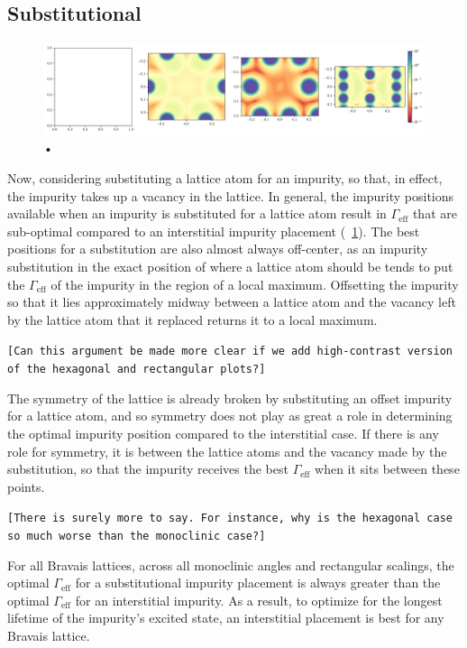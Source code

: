 \documentclass[aps,pra,superscriptaddress,twocolumn]{revtex4-1}
\newcommand{\fref}[1]{\text{Fig.}~\ref{#1}}
\newcommand{\commentSB}[1]{\texttt{\color{blue}[#1]}}
\begin{document}
\subsection{Substitutional}

\begin{figure}
    \centering
    \includegraphics[width=1.0\textwidth]{figures/temp_substitution_figure.png} 
    \caption{•}
    \label{fig:substitution}
\end{figure}

Now, considering substituting a lattice atom for an impurity, so that, in effect, the impurity takes up a vacancy in the lattice.
In general, the impurity positions available when an impurity is substituted for a lattice atom result in $\Gamma_\text{eff}$ that are sub-optimal compared to an interstitial impurity placement (\fref{fig:substitution}). The best positions for a substitution are also almost always off-center, as an impurity substitution in the exact position of where a lattice atom should be tends to put the $\Gamma_\text{eff}$ of the impurity in the region of a local maximum. Offsetting the impurity so that it lies approximately midway between a lattice atom and the vacancy left by the lattice atom that it replaced returns it to a local maximum. 

\commentSB{Can this argument be made more clear if we add high-contrast version of the hexagonal and rectangular plots?}

The symmetry of the lattice is already broken by substituting an offset impurity for a lattice atom, and so symmetry does not play as great a role in determining the optimal impurity position compared to the interstitial case. If there is any role for symmetry, it is between the lattice atoms and the vacancy made by the substitution, so that the impurity receives the best $\Gamma_\text{eff}$ when it sits between these points. 

\commentSB{There is surely more to say. For instance, why is the hexagonal case so much worse than the monoclinic case?}

For all Bravais lattices, across all monoclinic angles and rectangular scalings, the optimal $\Gamma_\text{eff}$ for a substitutional impurity placement is always greater than the optimal $\Gamma_\text{eff}$ for an interstitial impurity. As a result, to optimize for the longest lifetime of the impurity's excited state, an interstitial placement is best for any Bravais lattice. 
\end{document}
